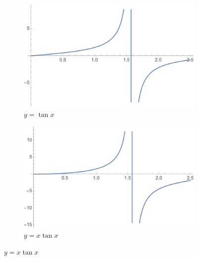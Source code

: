 \documentclass{article}
\begin{document}
        \begin{figure}[H]
            \centering
            \begin{subfigure}{0.48\textwidth}
                    
                \centering
                \includegraphics[scale=0.4]{tanx.png}
                \caption{$y=\tan{x}$}
                
            \end{subfigure}
            \begin{subfigure}{0.48\textwidth}
                
                \centering
                \includegraphics[scale=0.4]{xtanx.png}
                \caption{$y=x \tan{x}$}

            \end{subfigure}
              
        \end{figure}
\end{document}
